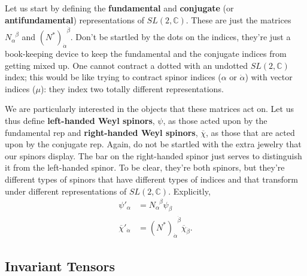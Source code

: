 \documentclass[12pt, oneside]{report}    %
\begin{document}
Let us start by defining the \textbf{fundamental} and \textbf{conjugate} (or \textbf{antifundamental}) representations of $SL(2,\mathbb C)$. These are just the matrices $N_\alpha^{\phantom\alpha\beta}$ and $(N^*)_{\dot\alpha}^{\phantom\alpha\dot\beta}$. Don't be startled by the dots on the indices, they're just a book-keeping device to keep the fundamental and the conjugate indices from getting mixed up. One cannot contract a dotted with an undotted $SL(2,\mathbb C)$ index; this would be like trying to contract spinor indices ($\alpha$ or $\dot\alpha$) with vector indices ($\mu$): they index two totally different representations.

We are particularly interested in the objects that these matrices act on. Let us thus define \textbf{left-handed Weyl spinors}, $\psi$, as those acted upon by the fundamental rep and \textbf{right-handed Weyl spinors}, $\overline\chi$, as those that are acted upon by the conjugate rep. Again, do not be startled with the extra jewelry that our spinors display. The bar on the right-handed spinor just serves to distinguish it from the left-handed spinor. To be clear, they're both spinors, but they're different types of spinors that have different types of indices and that transform under different representations of $SL(2,\mathbb C)$. Explicitly,
\begin{align}
    \psi'_\alpha &= N_\alpha^{\phantom\alpha\beta} \psi_\beta \\
    \overline\chi'_{\dot{\alpha}} &= \left(N^*\right)_{\dot{\alpha}}^{\phantom{\dot{\alpha}}\dot{\beta}}\overline\chi_{\dot{\beta}}.    
\end{align}



\subsection{Invariant Tensors} %
\end{document}
